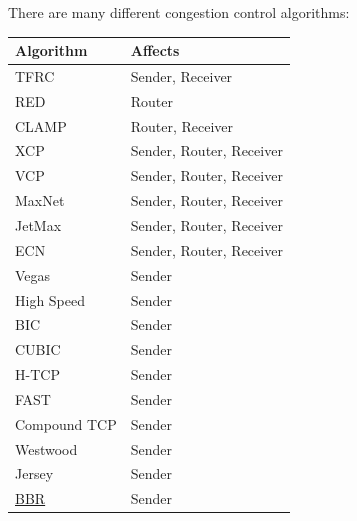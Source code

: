 There are many different congestion control algorithms:
\\ \begin{minipage}{0.45\textwidth}
    \begin{center}
        \begin{tabular}{l l}
            \textbf{Algorithm}                                 & \textbf{Affects}         \\
            \hline
            TFRC                                               & Sender, Receiver         \\
            RED                                                & Router                   \\
            CLAMP                                              & Router, Receiver         \\
            XCP                                                & Sender, Router, Receiver \\
            VCP                                                & Sender, Router, Receiver \\
            MaxNet                                             & Sender, Router, Receiver \\
            JetMax                                             & Sender, Router, Receiver \\
            ECN                                                & Sender, Router, Receiver \\
            Vegas                                              & Sender                   \\
            High Speed                                         & Sender                   \\
            BIC                                                & Sender                   \\
            CUBIC                                              & Sender                   \\
            H-TCP                                              & Sender                   \\
            FAST                                               & Sender                   \\
            Compound TCP                                       & Sender                   \\
            Westwood                                           & Sender                   \\
            Jersey                                             & Sender                   \\
            \href{https://research.google/pubs/pub45646/}{BBR} & Sender                   \\
        \end{tabular}
    \end{center}
\end{minipage}
